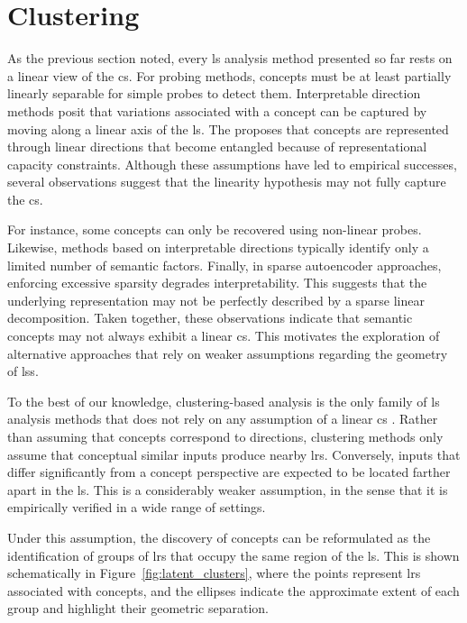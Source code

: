 \section{Clustering}
\label{sec:clustering}

As the previous section noted, every \gls{ls} analysis method presented so far rests on a linear view of the \gls{cs}.
For probing methods, concepts must be at least partially linearly separable for simple probes to detect them.
Interpretable direction methods posit that variations associated with a concept can be captured by moving along a linear axis of the \gls{ls}.
The \SuperpositionHypothesisName proposes that concepts are represented through linear directions that become entangled because of representational capacity constraints.
Although these assumptions have led to empirical successes, several observations suggest that the linearity hypothesis may not fully capture the \gls{cs}.

For instance, some concepts can only be recovered using non-linear probes.
Likewise, methods based on interpretable directions typically identify only a limited number of semantic factors.
Finally, in sparse autoencoder approaches, enforcing excessive sparsity degrades interpretability.
This suggests that the underlying representation may not be perfectly described by a sparse linear decomposition.
Taken together, these observations indicate that semantic concepts may not always exhibit a linear \gls{cs}.
This motivates the exploration of alternative approaches that rely on weaker assumptions regarding the geometry of \glspl{ls}.

To the best of our knowledge, clustering-based analysis is the only family of \gls{ls} analysis methods that does not rely on any assumption of a linear \gls{cs} \parencite{ren_deep_2022, wei_overview_2024}.
Rather than assuming that concepts correspond to directions, clustering methods only assume that conceptual similar inputs produce nearby \glspl{lr}.
Conversely, inputs that differ significantly from a concept perspective are expected to be located farther apart in the \gls{ls}.
This is a considerably weaker assumption, in the sense that it is empirically verified in a wide range of settings.

Under this assumption, the discovery of concepts can be reformulated as the identification of groups of \glspl{lr} that occupy the same region of the \gls{ls}.
This is shown schematically in Figure~\ref{fig:latent_clusters}, where the points represent \glspl{lr} associated with concepts, and the ellipses indicate the approximate extent of each group and highlight their geometric separation.

